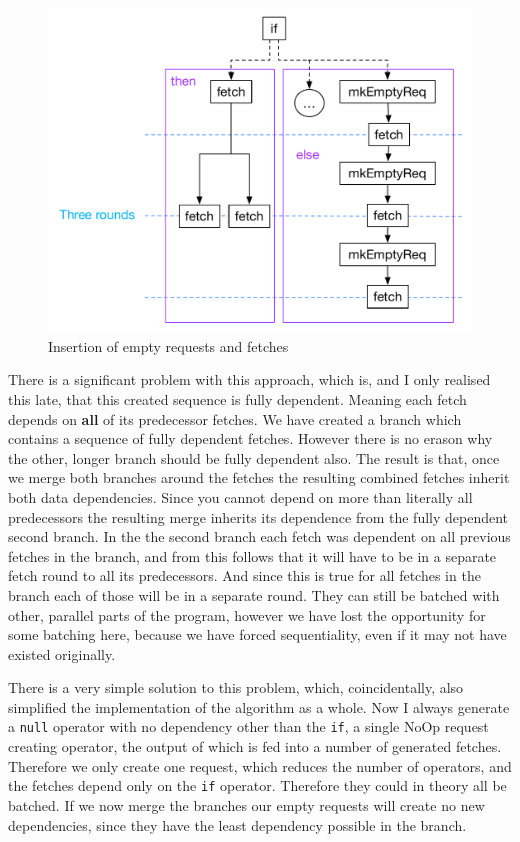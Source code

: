 \begin{figure}
    \includegraphics[width=\linewidth]{../Figures/if-insert-empty-parallel-after-insert}
    \caption{Insertion of empty requests and fetches}
    \label{if-insert-empty-parallel-after-insert}
\end{figure}

There is a significant problem with this approach, which is, and I only realised this late, that this created sequence is fully dependent.
Meaning each fetch depends on \textbf{all} of its predecessor fetches.
We have created a branch which contains a sequence of fully dependent fetches.
However there is no erason why the other, longer branch should be fully dependent also.
The result is that, once we merge both branches around the fetches the resulting combined fetches inherit both data dependencies.
Since you cannot depend on more than literally all predecessors the resulting merge inherits its dependence from the fully dependent second branch.
In the the second branch each fetch was dependent on all previous fetches in the branch, and from this follows that it will have to be in a separate fetch round to all its predecessors.
And since this is true for all fetches in the branch each of those will be in a separate round.
They can still be batched with other, parallel parts of the program, however we have lost the opportunity for some batching here, because we have forced sequentiality, even if it may not have existed originally.


There is a very simple solution to this problem, which, coincidentally, also simplified the implementation of the algorithm as a whole.
Now I always generate a \texttt{null} operator with no dependency other than the \texttt{if}, a single NoOp request creating operator, the output of which is fed into a number of generated fetches.
Therefore we only create one request, which reduces the number of operators, and the fetches depend only on the \texttt{if} operator.
Therefore they could in theory all be batched.
If we now merge the branches our empty requests will create no new dependencies, since they have the least dependency possible in the branch.

